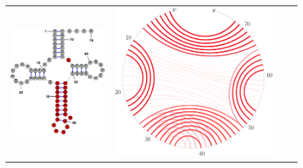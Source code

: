 \begin{figure}[t]
\begin{tabular}{cccc}
\includegraphics[scale=0.3]{figs/mfe_RNAstructure}
&
\includegraphics[scale=0.085]{figs/tRNA_circular}

\end{tabular}
\end{figure}

